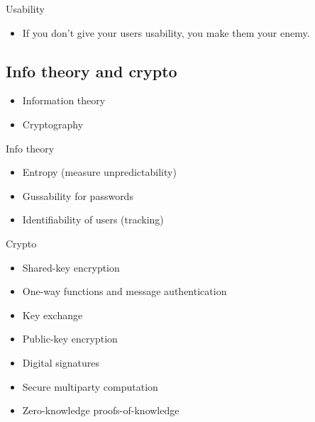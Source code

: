\begin{frame}
  \begin{block}{Usability}
    \begin{itemize}
      \item If you don't give your users usability, you make them your enemy.
    \end{itemize}
  \end{block}
\end{frame}

\subsection{Info theory and crypto}

\begin{frame}
  \begin{itemize}
    \item Information theory
    \item Cryptography
  \end{itemize}
\end{frame}

\begin{frame}
  \begin{block}{Info theory}
    \begin{itemize}
      \item Entropy (measure unpredictability)
    \end{itemize}
  \end{block}

  \begin{example}
    \begin{itemize}
      \item Gussability for passwords
      \item Identifiability of users (tracking)
    \end{itemize}
  \end{example}
\end{frame}

\begin{frame}
  \begin{block}{Crypto}
    \begin{itemize}
      \item Shared-key encryption
      \item One-way functions and message authentication

        \pause

      \item Key exchange
      \item Public-key encryption
      \item Digital signatures

        \pause

      \item Secure multiparty computation
      \item Zero-knowledge proofs-of-knowledge
    \end{itemize}
  \end{block}
\end{frame}

